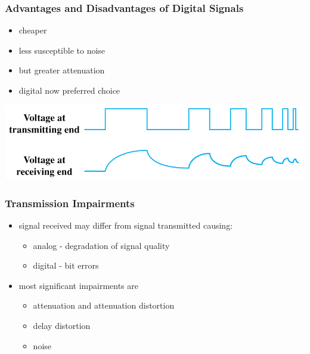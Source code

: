 \documentclass[pdflatex,compress]{beamer}
\begin{document}
\begin{frame}
	\frametitle{Advantages and Disadvantages of Digital Signals}
	\begin{itemize}
		\item cheaper
		\item less susceptible to noise
		\item but greater attenuation
		\item digital now preferred choice
	\end{itemize}
	\begin{center}
		\includegraphics[width=\linewidth]{img/img11}
	\end{center}
\end{frame}

\begin{frame}
	\frametitle{Transmission Impairments}
	\begin{itemize}
		\item signal received may differ from signal transmitted causing:
		\begin{itemize}
			\item analog - degradation of signal quality
			\item digital - bit errors
		\end{itemize}
		\item most significant impairments are
		\begin{itemize}
			\item attenuation and attenuation distortion
			\item delay distortion
			\item noise
		\end{itemize}
	\end{itemize}
\end{frame}
\end{document}
